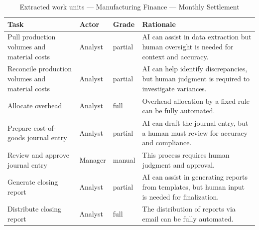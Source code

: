 \begin{table}[htbp]\centering
\small
\caption{Extracted work units — Manufacturing Finance — Monthly Settlement}
\label{tab:units_manufacturing_settlement}
\begin{tabular}{@{}llll@{}}
\toprule
Task & Actor & Grade & Rationale \\
\midrule
Pull production volumes and material costs & Analyst & partial & AI can assist in data extraction but human oversight is needed for context and accuracy. \\
Reconcile production volumes and material costs & Analyst & partial & AI can help identify discrepancies, but human judgment is required to investigate variances. \\
Allocate overhead & Analyst & full & Overhead allocation by a fixed rule can be fully automated. \\
Prepare cost-of-goods journal entry & Analyst & partial & AI can draft the journal entry, but a human must review for accuracy and compliance. \\
Review and approve journal entry & Manager & manual & This process requires human judgment and approval. \\
Generate closing report & Analyst & partial & AI can assist in generating reports from templates, but human input is needed for finalization. \\
Distribute closing report & Analyst & full & The distribution of reports via email can be fully automated. \\
\bottomrule
\end{tabular}
\end{table}
